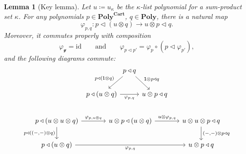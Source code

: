 \documentclass[11pt, one side, article]{memoir}
\theoremstyle{definition}
\theoremstyle{plain}
\newtheorem{lemma}[definitionx]{Lemma}
\newcommand{\Cat}[1]{\mathbf{#1}}%
\newcommand{\id}{\mathrm{id}}
\newcommand{\yon}{\mathcal{y}}
\newcommand{\poly}{\Cat{Poly}}
\newcommand{\polycart}{\poly^{\Cat{Cart}}}
\newcommand{\0}{\textsf{0}}
\newcommand{\1}{\tn{\textsf{1}}}
\newcommand{\tri}{\mathbin{\triangleleft}}
\newcommand{\qqand}{\qquad\text{and}\qquad}
\begin{document}
\begin{lemma}[Key lemma]\label{lemma.key}
Let $u\coloneqq u_\kappa$ be the $\kappa$-list polynomial for a sum-product set $\kappa$. For any polynomials $p\in\polycart$, $q\in\poly$, there is a natural map 
\[\varphi_{p,q}\colon p\tri(u\otimes q)\to u\otimes p\tri q.\] 
Moreover, it commutes properly with composition
\[
	\varphi_{\yon}=\id
	\qqand
	\varphi_{p\tri p'}=\varphi_{p}\circ (p\tri\varphi_{p'}),
\]
and the following diagrams commute:
\begin{gather*}
\begin{tikzcd}[column sep=0, ampersand replacement=\&]
	\&p\tri q\ar[dl, "p\tri(\1\otimes q)"']\ar[dr,"\1\otimes p\tri q"]\\
	p\tri(u\otimes q)\ar[rr, "\varphi_{p,q}"']\&\&u\otimes p\tri q
\end{tikzcd}
\\[15pt]
\begin{tikzcd}[, ampersand replacement=\&, column sep=large]
	p\tri(u\otimes u\otimes q)\ar[r, "\varphi_{p,u\otimes q}"]\ar[d, "p\tri{((-,-)\otimes q)}"']\&
	u\otimes p\tri(u\otimes q)\ar[r, "u\otimes\varphi_{p,q}"]\&
	u\otimes u\otimes p\tri q\ar[d, "{(-,-)}\otimes p\tri q"]\\
	p\tri (u\otimes q)\ar[rr, "\varphi_{p,q}"']\&\&
	u\otimes p\tri q
\end{tikzcd}
\end{gather*}
\end{lemma}
\end{document}
